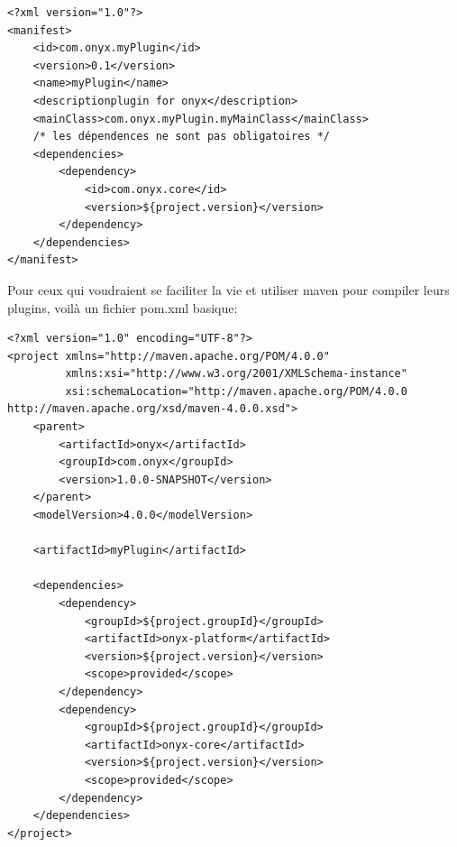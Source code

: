 \begin{verbatim}
<?xml version="1.0"?>
<manifest>
    <id>com.onyx.myPlugin</id>
    <version>0.1</version>
    <name>myPlugin</name>
    <descriptionplugin for onyx</description>
    <mainClass>com.onyx.myPlugin.myMainClass</mainClass>
    /* les dépendences ne sont pas obligatoires */
    <dependencies>
        <dependency>
            <id>com.onyx.core</id>
            <version>${project.version}</version>
        </dependency>
    </dependencies>
</manifest>
\end{verbatim}

Pour ceux qui voudraient se faciliter la vie et utiliser maven pour compiler leurs plugins, voilà un fichier pom.xml basique:

\begin{verbatim}
<?xml version="1.0" encoding="UTF-8"?>
<project xmlns="http://maven.apache.org/POM/4.0.0"
         xmlns:xsi="http://www.w3.org/2001/XMLSchema-instance"
         xsi:schemaLocation="http://maven.apache.org/POM/4.0.0 http://maven.apache.org/xsd/maven-4.0.0.xsd">
    <parent>
        <artifactId>onyx</artifactId>
        <groupId>com.onyx</groupId>
        <version>1.0.0-SNAPSHOT</version>
    </parent>
    <modelVersion>4.0.0</modelVersion>

    <artifactId>myPlugin</artifactId>

    <dependencies>
        <dependency>
            <groupId>${project.groupId}</groupId>
            <artifactId>onyx-platform</artifactId>
            <version>${project.version}</version>
            <scope>provided</scope>
        </dependency>
        <dependency>
            <groupId>${project.groupId}</groupId>
            <artifactId>onyx-core</artifactId>
            <version>${project.version}</version>
            <scope>provided</scope>
        </dependency>
    </dependencies>
</project>
\end{verbatim}
